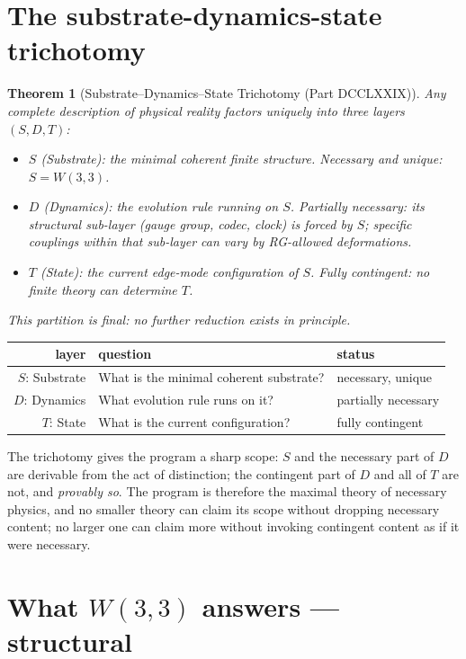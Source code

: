 \documentclass[11pt]{article}
\def\textbf#1{#1}%
\newtheorem*{theorem}{Theorem}
\begin{document}
\section{The substrate-dynamics-state trichotomy}

\begin{theorem}[Substrate--Dynamics--State Trichotomy (Part DCCLXXIX)]
Any complete description of physical reality factors uniquely into three layers $(S, D, T)$:
\begin{itemize}[leftmargin=2em]
\item \textbf{$S$ (Substrate):} the minimal coherent finite structure. \textbf{Necessary and unique:} $S = W(3,3)$.
\item \textbf{$D$ (Dynamics):} the evolution rule running on $S$. \textbf{Partially necessary:} its structural sub-layer (gauge group, codec, clock) is forced by $S$; specific couplings within that sub-layer can vary by RG-allowed deformations.
\item \textbf{$T$ (State):} the current edge-mode configuration of $S$. \textbf{Fully contingent:} no finite theory can determine $T$.
\end{itemize}
This partition is final: no further reduction exists in principle.
\end{theorem}

\begin{center}
\begin{tabular}{r l l}
\toprule
layer & question & status \\
\midrule
$S$: Substrate & What is the minimal coherent substrate? & necessary, unique \\
$D$: Dynamics & What evolution rule runs on it? & partially necessary \\
$T$: State & What is the current configuration? & fully contingent \\
\bottomrule
\end{tabular}
\end{center}

The trichotomy gives the program a sharp scope: $S$ and the necessary part of $D$ are derivable from the act of distinction; the contingent part of $D$ and all of $T$ are not, and \emph{provably so}. The program is therefore the maximal theory of necessary physics, and \textbf{no smaller theory can claim its scope without dropping necessary content; no larger one can claim more without invoking contingent content as if it were necessary}.

\section{\texorpdfstring{What $W(3,3)$ answers --- structural}{What W(3,3) answers --- structural}}
\end{document}
